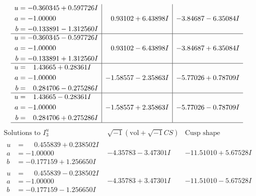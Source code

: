 \documentclass[1p]{elsarticle_modified}
\theoremstyle{definition}
\newcommand{\I}{\sqrt{-1}}
\begin{document}
$$\begin{array}{c|c|c}
\begin{aligned}
u &= -0.360345 + 0.597726 I \\
a &= -1.00000\phantom{ +0.000000I} \\
b &= -0.133891 - 1.312560 I\end{aligned}
 & \phantom{-}0.93102 + 6.43898 I & -3.84687 - 6.35084 I \\ \hline\begin{aligned}
u &= -0.360345 - 0.597726 I \\
a &= -1.00000\phantom{ +0.000000I} \\
b &= -0.133891 + 1.312560 I\end{aligned}
 & \phantom{-}0.93102 - 6.43898 I & -3.84687 + 6.35084 I \\ \hline\begin{aligned}
u &= \phantom{-}1.43665 + 0.28361 I \\
a &= -1.00000\phantom{ +0.000000I} \\
b &= \phantom{-}0.284706 - 0.275286 I\end{aligned}
 & -1.58557 - 2.35863 I & -5.77026 + 0.78709 I \\ \hline\begin{aligned}
u &= \phantom{-}1.43665 - 0.28361 I \\
a &= -1.00000\phantom{ +0.000000I} \\
b &= \phantom{-}0.284706 + 0.275286 I\end{aligned}
 & -1.58557 + 2.35863 I & -5.77026 - 0.78709 I\\
 \hline 
 \end{array}$$\newpage$$\begin{array}{c|c|c}  
\text{Solutions to }I^u_{3}& \I (\text{vol} + \sqrt{-1}CS) & \text{Cusp shape}\\
 \hline 
\begin{aligned}
u &= \phantom{-}0.455839 + 0.238502 I \\
a &= -1.00000\phantom{ +0.000000I} \\
b &= -0.177159 + 1.256650 I\end{aligned}
 & -4.35783 - 3.47301 I & -11.51010 + 5.67528 I \\ \hline\begin{aligned}
u &= \phantom{-}0.455839 - 0.238502 I \\
a &= -1.00000\phantom{ +0.000000I} \\
b &= -0.177159 - 1.256650 I\end{aligned}
 & -4.35783 + 3.47301 I & -11.51010 - 5.67528 I \\ \hline\begin{aligned}

\end{aligned}
\end{array}$$
\end{document}
